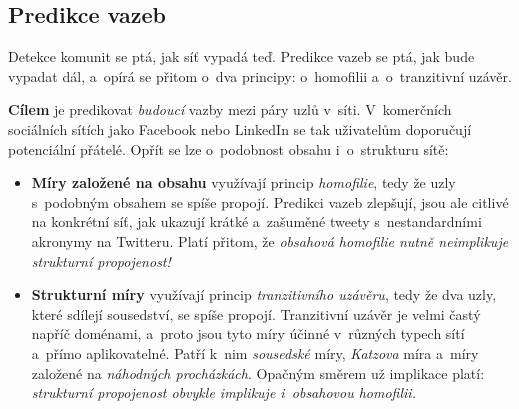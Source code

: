 \documentclass[11pt,a4paper]{article}
\theoremstyle{definition}
\begin{document}
\subsection{Predikce vazeb}

Detekce komunit se ptá, jak síť vypadá teď. Predikce vazeb se ptá, jak bude vypadat dál, a~opírá
se přitom o~dva principy: o~homofilii a~o~tranzitivní uzávěr.

\begin{defbox}
\textbf{Cílem} je predikovat \emph{budoucí} vazby mezi páry uzlů v~síti. V~komerčních sociálních
sítích jako Facebook nebo LinkedIn se tak uživatelům doporučují potenciální přátelé. Opřít se
lze o~podobnost obsahu i~o~strukturu sítě:
\begin{itemize}
\item \textbf{Míry založené na obsahu} využívají princip \emph{homofilie}, tedy že uzly
      s~podobným obsahem se spíše propojí. Predikci vazeb zlepšují, jsou ale citlivé na
      konkrétní síť, jak ukazují krátké a~zašuměné tweety s~nestandardními akronymy na Twitteru.
      Platí přitom, že \emph{obsahová homofilie nutně neimplikuje strukturní propojenost!}
\item \textbf{Strukturní míry} využívají princip \emph{tranzitivního uzávěru}, tedy že dva uzly,
      které sdílejí sousedství, se spíše propojí. Tranzitivní uzávěr je velmi častý napříč
      doménami, a~proto jsou tyto míry účinné v~různých typech sítí a~přímo aplikovatelné.
      Patří k~nim \emph{sousedské} míry, \emph{Katzova} míra a~míry založené na \emph{náhodných
      procházkách}. Opačným směrem už implikace platí: \emph{strukturní propojenost obvykle
      implikuje i~obsahovou homofilii.}
\end{itemize}
\end{defbox}
\end{document}
